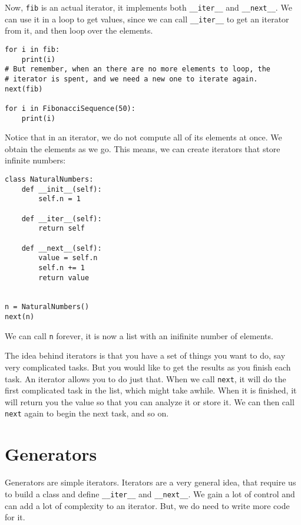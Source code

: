 \documentclass[12pt, a4paper]{article}
\begin{document}
Now, \texttt{fib} is an actual iterator, it implements both \texttt{\_\_iter\_\_} and \texttt{\_\_next\_\_}.
We can use it in a loop to get values, since we can call \texttt{\_\_iter\_\_} to get an iterator from it, and then loop over the elements.
\lstset{language=jupyter-python,label= ,caption= ,captionpos=b,numbers=none}
\begin{lstlisting}
for i in fib:
    print(i)
# But remember, when an there are no more elements to loop, the
# iterator is spent, and we need a new one to iterate again.
next(fib)

for i in FibonacciSequence(50):
    print(i)
\end{lstlisting}

Notice that in an iterator, we do not compute all of its elements at once.
We obtain the elements as we go.
This means, we can create iterators that store infinite numbers:
\lstset{language=jupyter-python,label= ,caption= ,captionpos=b,numbers=none}
\begin{lstlisting}
class NaturalNumbers:
    def __init__(self):
        self.n = 1

    def __iter__(self):
        return self

    def __next__(self):
        value = self.n
        self.n += 1
        return value


n = NaturalNumbers()
next(n)
\end{lstlisting}
We can call \texttt{n} forever, it is now a list with an inifinite number of elements.

The idea behind iterators is that you have a set of things you want to do, say very complicated tasks.
But you would like to get the results as you finish each task.
An iterator allows you to do just that.
When we call \texttt{next}, it will do the first complicated task in the list, which might take awhile.
When it is finished, it will return you the value so that you can analyze it or store it.
We can then call \texttt{next} again to begin the next task, and so on.
\section{Generators}
\label{sec:org087f1bb}
Generators are simple iterators.
Iterators are a very general idea, that require us to build a class and define \texttt{\_\_iter\_\_} and \texttt{\_\_next\_\_}.
We gain a lot of control and can add a lot of complexity to an iterator.
But, we do need to write more code for it.
\end{document}
